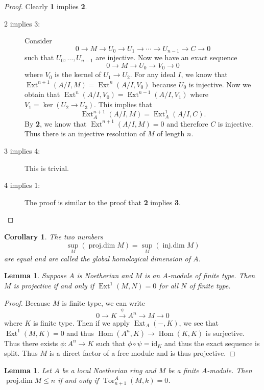 \documentclass[leqno, openany]{memoir}
\newtheorem{cor}[thm]{Corollary}
\newtheorem{lem}[thm]{Lemma}
\theoremstyle{definition}
\theoremstyle{remark}
\theoremstyle{plain}
\theoremstyle{definition}
\theoremstyle{remark}
\newcommand{\mr}[1]{\mathrm{#1}}
\DeclareMathOperator{\Hom}{Hom}
\DeclareMathOperator{\Ext}{Ext}
\DeclareMathOperator{\Tor}{Tor}
\begin{document}
\begin{proof} Clearly \textbf{1} implies \textbf{2}.  \begin{description}
    \item[2 implies 3:] Consider \[ 0 \to M \to U_0 \to U_1 \to \cdots \to
        U_{n-1} \to C \to 0 \] such that $U_0, \ldots, U_{n-1}$ are injective.
        Now we have an exact sequence \[ 0 \to M \to U_0 \to V_0 \to 0 \] where
        $V_0$ is the kernel of $U_1 \to U_2$. For any ideal $I$, we know that
        $\Ext^{n+1}(A/I, M) = \Ext^n(A/I, V_0)$ because $U_0$ is injective. Now
        we obtain that $\Ext^n(A/I, V_0) = \Ext^{n-1}(A/I, V_1)$ where $V_1 =
        \ker (U_2 \to U_3)$. This implies that \[ \Ext_A^{n+1}(A/I, M) =
        \Ext_A^1(A/I, C). \] By \textbf{2}, we know that $\Ext^{n+1}(A/I, M) =
        0$ and therefore $C$ is injective. Thus there is an injective
        resolution of $M$ of length $n$.  \item[3 implies 4:] This is trivial.
        \item[4 implies 1:] The proof is similar to the proof that \textbf{2}
    implies \textbf{3}. \qedhere \end{description} \end{proof}

\begin{cor} The two numbers \[ \sup_M( \operatorname{proj.dim} M ) = \sup_M
(\operatorname{inj.dim} M) \] are equal and are called the \textit{global
homological dimension} of $A$.  \end{cor}

\begin{lem} Suppose $A$ is Noetherian and $M$ is an $A$-module of finite type.
Then $M$ is projective if and only if $\Ext^1(M,N) = 0$ for all $N$ of finite
type.  \end{lem}

\begin{proof} Because $M$ is finite type, we can write \[ 0 \to K
\xrightarrow{\psi} A^n \to M \to 0 \] where $K$ is finite type. Then if we
apply $\Ext_A(-,K)$, we see that $\Ext^1(M, K) = 0$ and thus $\Hom(A^n,K) \to
\Hom(K,K)$ is surjective. Thus there exists $\phi \colon A^n \to K$ such that
$\phi \circ \psi = \mr{id}_K$ and thus the exact sequence is split. Thus $M$ is
a direct factor of a free module and is thus projective.  \end{proof}

\begin{lem} Let $A$ be a local Noetherian ring and $M$ be a finite $A$-module.
Then $\operatorname{proj.dim} M \leq n$ if and only if $\Tor_{n+1}^A(M, k) =
0$.  \end{lem}
\end{document}
